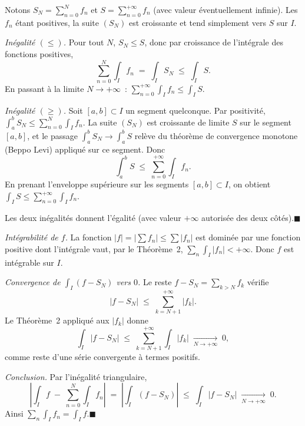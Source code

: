 \begin{mdframed}[style=proofbar]
  Notons $S_N = \sum_{n=0}^{N} f_n$ et $S = \sum_{n=0}^{+\infty} f_n$
  (avec valeur éventuellement infinie). Les $f_n$ étant positives, la
  suite $(S_N)$ est croissante et tend simplement vers $S$ sur $I$.

  \medskip
  \textit{Inégalité $(\leq)$.}\enspace%
  Pour tout $N$, $S_N \leq S$, donc par croissance de l'intégrale
  des fonctions positives,
  \[
    \sum_{n=0}^{N}\int_I f_n \;=\; \int_I S_N \;\leq\; \int_I S.
  \]
  En passant à la limite $N\to+\infty$~: $\sum_{n=0}^{+\infty}\int_I f_n \leq \int_I S$.

  \medskip
  \textit{Inégalité $(\geq)$.}\enspace%
  Soit $[a,b]\subset I$ un segment quelconque. Par positivité,
  $\int_a^b S_N \leq \sum_{n=0}^{N}\int_I f_n$. La suite $(S_N)$ est
  croissante de limite $S$ sur le segment $[a,b]$, et le passage
  $\int_a^b S_N \to \int_a^b S$ relève du théorème de convergence
  monotone (Beppo Levi) appliqué sur ce segment. Donc
  \[
    \int_a^b S \;\leq\; \sum_{n=0}^{+\infty}\int_I f_n.
  \]
  En prenant l'enveloppe supérieure sur les segments $[a,b]\subset I$,
  on obtient $\int_I S \leq \sum_{n=0}^{+\infty}\int_I f_n$.

  \medskip
  Les deux inégalités donnent l'égalité (avec valeur $+\infty$
  autorisée des deux côtés).\hfill$\blacksquare$
\end{mdframed}


\begin{mdframed}[style=proofbar]
  \textit{Intégrabilité de $f$.}\enspace%
  La fonction $|f| = \bigl|\sum f_n\bigr| \leq \sum |f_n|$ est dominée
  par une fonction positive dont l'intégrale vaut, par le Théorème~2,
  $\sum_n \int_I |f_n| < +\infty$. Donc $f$ est intégrable sur $I$.

  \medskip
  \textit{Convergence de $\int_I (f - S_N)$ vers $0$.}\enspace%
  Le reste $f - S_N = \sum_{k>N} f_k$ vérifie
  \[
    |f - S_N| \;\leq\; \sum_{k=N+1}^{+\infty} |f_k|.
  \]
  Le Théorème~2 appliqué aux $|f_k|$ donne
  \[
    \int_I |f - S_N| \;\leq\;
    \sum_{k=N+1}^{+\infty} \int_I |f_k|
    \;\xrightarrow[N\to+\infty]{}\; 0,
  \]
  comme reste d'une série convergente à termes positifs.

  \medskip
  \textit{Conclusion.}\enspace%
  Par l'inégalité triangulaire,
  \[
    \left|\int_I f \;-\; \sum_{n=0}^{N}\int_I f_n\right|
    \;=\; \left|\int_I (f - S_N)\right|
    \;\leq\; \int_I |f - S_N|
    \;\xrightarrow[N\to+\infty]{}\; 0.
  \]
  Ainsi $\sum_n \int_I f_n = \int_I f$.\hfill$\blacksquare$
\end{mdframed}


